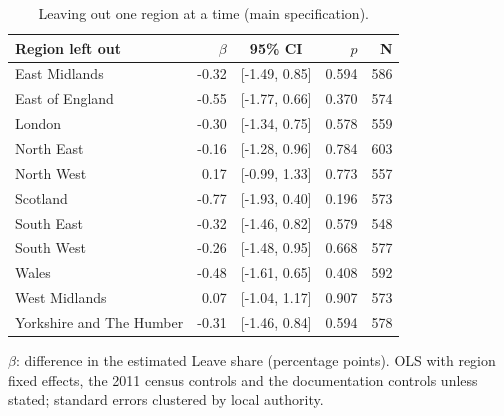 \documentclass[11pt,a4paper]{article}
\begin{document}
\begin{table}[H]\centering\footnotesize\begin{threeparttable}\caption{Leaving out one region at a time (main specification).}\label{tab:loro}\begin{tabular}{p{8.2cm}rcrr}\toprule Region left out & $\beta$ & 95\% CI & $p$ & N\\\midrule
East Midlands & -0.32 & [-1.49, 0.85] & 0.594 & 586\\
East of England & -0.55 & [-1.77, 0.66] & 0.370 & 574\\
London & -0.30 & [-1.34, 0.75] & 0.578 & 559\\
North East & -0.16 & [-1.28, 0.96] & 0.784 & 603\\
North West & 0.17 & [-0.99, 1.33] & 0.773 & 557\\
Scotland & -0.77 & [-1.93, 0.40] & 0.196 & 573\\
South East & -0.32 & [-1.46, 0.82] & 0.579 & 548\\
South West & -0.26 & [-1.48, 0.95] & 0.668 & 577\\
Wales & -0.48 & [-1.61, 0.65] & 0.408 & 592\\
West Midlands & 0.07 & [-1.04, 1.17] & 0.907 & 573\\
Yorkshire and The Humber & -0.31 & [-1.46, 0.84] & 0.594 & 578\\
\bottomrule\end{tabular}\begin{tablenotes}\footnotesize\item $\beta$: difference in the estimated Leave share (percentage points). OLS with region fixed effects, the 2011 census controls and the documentation controls unless stated; standard errors clustered by local authority.\end{tablenotes}\end{threeparttable}\end{table}
\end{document}
